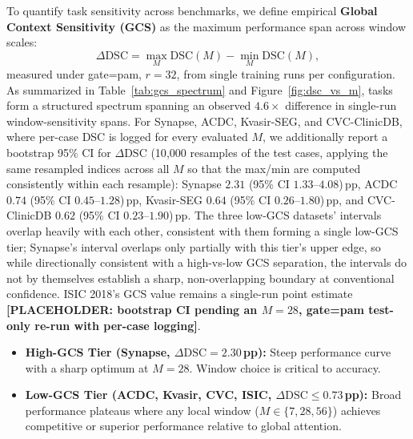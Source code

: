 To quantify task sensitivity across benchmarks, we define empirical \textbf{Global Context Sensitivity (GCS)} as the maximum performance span across window scales:
\begin{equation}
  \Delta\text{DSC} = \max_{M} \text{DSC}(M) - \min_{M} \text{DSC}(M),
  \label{eq:gcs}
\end{equation}
measured under gate=pam, $r{=}32$, from single training runs per configuration. As summarized in Table~\ref{tab:gcs_spectrum} and Figure~\ref{fig:dsc_vs_m}, tasks form a structured spectrum spanning an observed $4.6\times$ difference in single-run window-sensitivity spans. For Synapse, ACDC, Kvasir-SEG, and CVC-ClinicDB, where per-case DSC is logged for every evaluated $M$, we additionally report a bootstrap 95\% CI for $\Delta\text{DSC}$ (10{,}000 resamples of the test cases, applying the same resampled indices across all $M$ so that the max/min are computed consistently within each resample): Synapse $2.31$ (95\% CI $1.33$--$4.08$)\,pp, ACDC $0.74$ (95\% CI $0.45$--$1.28$)\,pp, Kvasir-SEG $0.64$ (95\% CI $0.26$--$1.80$)\,pp, and CVC-ClinicDB $0.62$ (95\% CI $0.23$--$1.90$)\,pp. The three low-GCS datasets' intervals overlap heavily with each other, consistent with them forming a single low-GCS tier; Synapse's interval overlaps only partially with this tier's upper edge, so while directionally consistent with a high-vs-low GCS separation, the intervals do not by themselves establish a sharp, non-overlapping boundary at conventional confidence. ISIC 2018's GCS value remains a single-run point estimate \textbf{[PLACEHOLDER: bootstrap CI pending an $M{=}28$, gate=pam test-only re-run with per-case logging]}.
\begin{itemize}
  \item \textbf{High-GCS Tier (Synapse, $\Delta\text{DSC} = 2.30$\,pp):} Steep performance curve with a sharp optimum at $M{=}28$. Window choice is critical to accuracy.
  \item \textbf{Low-GCS Tier (ACDC, Kvasir, CVC, ISIC, $\Delta\text{DSC} \le 0.73$\,pp):} Broad performance plateaus where any local window ($M \in \{7, 28, 56\}$) achieves competitive or superior performance relative to global attention.
\end{itemize}

